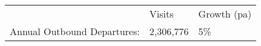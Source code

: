 \begin{tabular}[t]{p{4.8cm}>{\hfill}p{1.3cm}>{\hfill}p{1.4cm}}
   & Visits & Growth (pa) \\ 
 Annual Outbound Departures: & 2,306,776 & 5\% \\ 
  \end{tabular}
